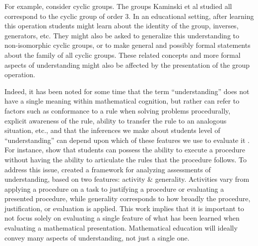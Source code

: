 \documentclass[man,10pt]{apa6}
\begin{document}
For example, consider cyclic groups. The groups Kaminski et al studied all correspond to the cyclic group of order 3. In an educational setting, after learning this operation students might learn about the identity of the group, inverses, generators, etc. They might also be asked to generalize this understanding to non-isomorphic cyclic groups, or to make general and possibly formal statements about the family of all cyclic groups. These related concepts and more formal aspects of understanding might also be affected by the presentation of the group operation. \par
Indeed, it has been noted for some time that the term ``understanding'' does not have a single meaning within mathematical cognition, but rather can refer to factors such as conformance to a rule when solving problems procedurally, explicit awareness of the rule, ability to transfer the rule to an analogous situation, etc., and that the inferences we make about students level of ``understanding'' can depend upon which of these features we use to evaluate it \cite{Bisanz1992}. For instance,  show that students can possess the ability to execute a procedure without having the ability to articulate the rules that the procedure follows. To address this issue,  created a framework for analyzing assessments of understanding, based on two features: activity \& generality. Activities vary from applying a procedure on a task to justifying a procedure or evaluating a presented procedure, while generality corresponds to how broadly the procedure, justification, or evaluation is applied. This work implies that it is important to not focus solely on evaluating a single feature of what has been learned when evaluating a mathematical presentation. Mathematical education will ideally convey many aspects of understanding, not just a single one. \par
\end{document}
